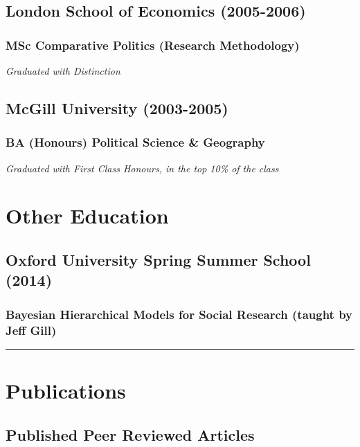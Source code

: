 \documentclass[a4paper]{article}
\begin{document}
\subsection*{London School of Economics (2005-2006)}
\subsubsection*{MSc Comparative Politics (Research Methodology)}

{\emph{Graduated with Distinction}}

\subsection*{McGill University (2003-2005)}
\subsubsection*{BA (Honours) Political Science \& Geography}

{\emph{Graduated with First Class Honours, in the top 10\% of the class}}

\section*{Other Education}

\subsection*{Oxford University Spring Summer School (2014)}

\subsubsection*{Bayesian Hierarchical Models for Social Research (taught by Jeff Gill)}

\vspace{0.25cm}
\medskip\hrule height 1pt
\vspace{0.5cm}


\section*{Publications}

\subsection*{Published Peer Reviewed Articles}
\end{document}
